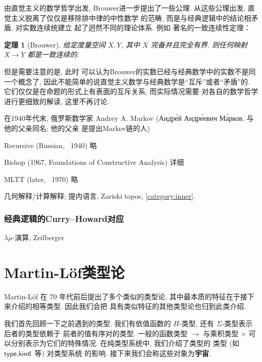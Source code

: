 \documentclass[UTF8]{ctexbook}
\newcommand{\cons}[1]{\textsf{#1}}
\theoremstyle{plain}
\newtheorem{theorem}{定理}[chapter]
\theoremstyle{definition}
\theoremstyle{remark}
\begin{document}
由直觉主义的数学哲学出发, Brouwer进一步提出了一些公理.
从这些公理出发, 直觉主义脱离了仅仅是移除排中律的中性数学
的范畴, 而是与经典逻辑中的结论相矛盾, 对实数连续统建立
起了迥然不同的理论体系. 例如
著名的一致连续性定理：
\begin{theorem}[Brouwer]
给定度量空间 \(X,Y\), 其中 \(X\) 完备并且完全有界.
则任何映射 \(X\to Y\) 都是一致连续的.
\end{theorem}
但是需要注意的是, 此时
可以认为Brouwer的实数已经与经典数学中的实数不是同一个概念了,
因此不能简单的说直觉主义数学与经典数学是“互斥”或者“矛盾”的.
它们仅仅是在命题的形式上有表面的互斥关系, 而实际情况需要
对各自的数学哲学进行更细致的解读, 这里不再讨论.

在1940年代末, 俄罗斯数学家 Andrey A. Markov
({\tempfont Андре́й Андре́евич Ма́рков}, 与他的父亲同名; 他的父亲
是提出Markov链的人)

Recursive (Russian, ~1940) 略

Bishop (1967, Foundations of Constructive Analysis) 详细

MLTT (later, ~1970) 略

几何解释/计算解释;
提内语言, Zariski topos, \ref{category:inner}.

\subsection{经典逻辑的Curry--Howard对应}

\(\lambda\mu\)-演算, Zeilberger

\chapter{Martin-L\"of类型论}\label{martinlof}

Martin-L\"of 在 70 年代前后提出了多个类似的类型论.
其中最本质的特征在于接下来介绍的相等类型. 因此我们会把
具有类似特征的其他类型论也归到此类介绍.

我们首先回顾一下之前遇到的类型. 我们有依值函数的
\(\Pi\)-类型, 还有 \(\Sigma\)-类型表示后者的类型依赖于
前者的值有序对的类型. 一般的函数类型 \(\to\) 与乘积类型
\(\times\) 可以分别表示为它们的特殊情况.
在纯类型系统中, 我们介绍了类型的
类型 (如 \(\cons{type}, \cons{kind}\) 等) 对类型系统
的影响. 接下来我们会称这些对象为\textbf{宇宙}.
\end{document}
